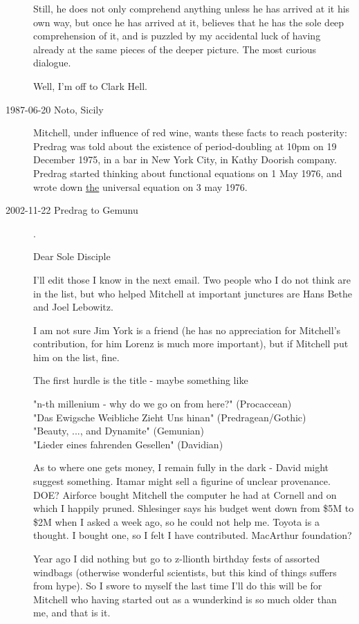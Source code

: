 \begin{description}
Still, he does not only comprehend anything unless he has arrived at it
his own way, but once he has arrived at it, believes that he has the
sole deep comprehension of it, and is puzzled by my accidental luck of
having already at the same pieces of the deeper picture. The most curious
dialogue.

Well, I'm off to Clark Hell.

\item[1987-06-20 Noto, Sicily]
Mitchell, under influence of red wine, wants these facts to reach
posterity: Predrag was told about the existence of period-doubling at
10pm on 19 December 1975, in a bar in New York City, in Kathy Doorish
company. Predrag started thinking about functional equations on 1 May
1976, and wrote down \underline{the} universal equation on 3 may 1976.

\item[2002-11-22 Predrag to Gemunu].

Dear Sole Disciple

I'll edit those I know in the next email. Two people who I do not think
are in the list, but who helped Mitchell at important junctures are
Hans Bethe
and
Joel Lebowitz.

I am not sure Jim York is a friend (he has no appreciation for Mitchell's
contribution, for him Lorenz is much more important), but if Mitchell put
him on the list, fine.

The first hurdle is the title - maybe something like

\noindent
"n-th millenium - why do we go on from here?" (Procaccean)\\
"Das Ewigsche Weibliche Zieht Uns hinan" (Predragean/Gothic)\\
"Beauty, ..., and Dynamite" (Gemunian)\\
"Lieder eines fahrenden Gesellen" (Davidian)

As to where one gets money, I remain fully in the dark -
David might suggest something. Itamar might sell a figurine of unclear
provenance. DOE? Airforce bought Mitchell the computer he had at Cornell
and on which I happily pruned. Shlesinger says his budget went down from
\$5M to \$2M when I asked a week ago, so he could not help me. Toyota is a
thought. I bought one, so I felt I have contributed. MacArthur foundation?

Year ago I did nothing but go to z-llionth birthday fests of assorted
windbags (otherwise wonderful scientists, but this kind of things suffers
from hype). So I swore to myself the last time I'll do this will be for
Mitchell who having started out as a wunderkind is so much older than me,
and that is it.


\end{description}
